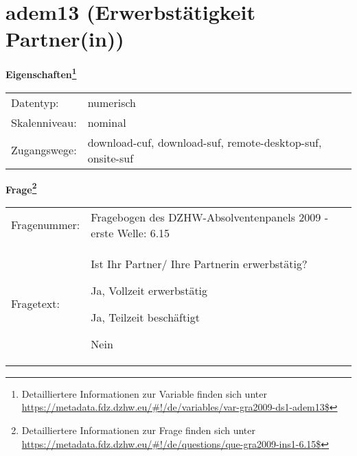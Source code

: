 
    \setcounter{footnote}{0}

    \vspace*{-1.8cm}
	\section{adem13 (Erwerbstätigkeit Partner(in))}
	\label{section:adem13}



    \vspace*{0.5cm}
    \noindent\textbf{Eigenschaften\footnote{Detailliertere Informationen zur Variable finden sich unter
		\url{https://metadata.fdz.dzhw.eu/\#!/de/variables/var-gra2009-ds1-adem13$}}}\\
	\begin{tabularx}{\hsize}{@{}lX}
	Datentyp: & numerisch \\
	Skalenniveau: & nominal \\
	Zugangswege: &
	  download-cuf, 
	  download-suf, 
	  remote-desktop-suf, 
	  onsite-suf
 \\
    \end{tabularx}



				\vspace*{0.5cm}
                \noindent\textbf{Frage\footnote{Detailliertere Informationen zur Frage finden sich unter
		              \url{https://metadata.fdz.dzhw.eu/\#!/de/questions/que-gra2009-ins1-6.15$}}}\\
				\begin{tabularx}{\hsize}{@{}lX}
					Fragenummer: &
					  Fragebogen des DZHW-Absolventenpanels 2009 - erste Welle:
					  6.15
 \\
					Fragetext: & Ist Ihr Partner/ Ihre Partnerin erwerbstätig?\par  Ja, Vollzeit erwerbstätig\par  Ja, Teilzeit beschäftigt\par  Nein \\
				\end{tabularx}





